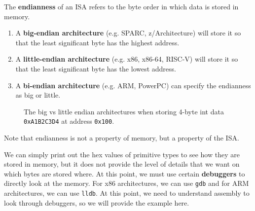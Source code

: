   \begin{definition}
    \label{def:endian-architecture}
    The \textbf{endianness} of an ISA refers to the byte order in which data is stored in memory. 
    \begin{enumerate} 
      \item A \textbf{big-endian architecture} (e.g. SPARC, z/Architecture) will store it so that the least significant byte has the highest address.
      \item A \textbf{little-endian architecture} (e.g. x86, x86-64, RISC-V) will store it so that the least significant byte has the lowest address. 
      \item A \textbf{bi-endian architecture} (e.g. ARM, PowerPC) can specify the endianness as big or little. 
    \end{enumerate}

    \begin{figure}[H]
      \centering 
      \caption{The big vs little endian architectures when storing 4-byte int data \texttt{0xA1B2C3D4} at address \texttt{0x100}.} 
      \label{fig:endianness}
    \end{figure}
  \end{definition}
  
  Note that endianness is not a property of memory, but a property of the ISA. 

  \begin{example}
    \label{ex:inspecting-memory-with-a-debugger}
    We can simply print out the hex values of primitive types to see how they are stored in memory, but it does not provide the level of details that we want on which bytes are stored where. At this point, we must use certain \textbf{debuggers} to directly look at the memory. For x86 architectures, we can use \texttt{gdb} and for ARM architectures, we can use \texttt{lldb}. At this point, we need to understand assembly to look through debuggers, so we will provide the example here. 
  \end{example}

